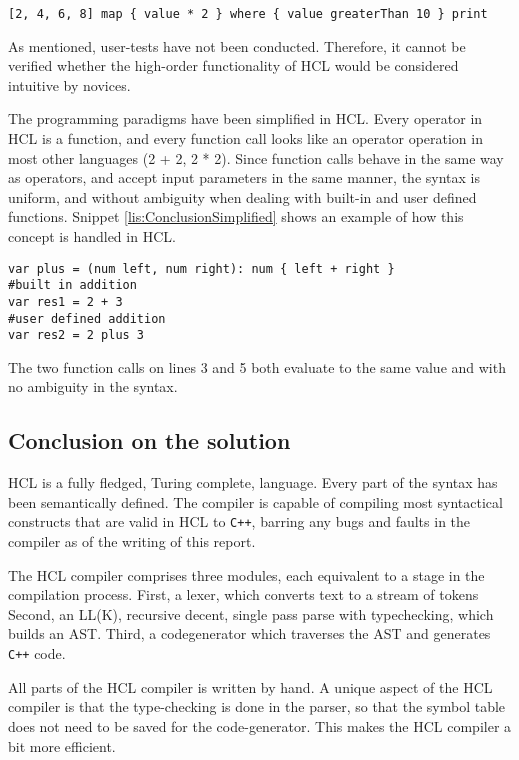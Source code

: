 \begin{lstlisting}[language=hcl,label=lis:ConclusionMapFilter,caption=High-order functionality in HCL]
[2, 4, 6, 8] map { value * 2 } where { value greaterThan 10 } print
\end{lstlisting}

As mentioned, user-tests have not been conducted.
Therefore, it cannot be verified whether the high-order functionality of HCL would be considered intuitive by novices.

The programming paradigms have been simplified in HCL.
Every operator in HCL is a function, and every function call looks like an operator operation in most other languages (2 + 2, 2 * 2).
Since function calls behave in the same way as operators, and accept input parameters in the same manner, the syntax is uniform, and without ambiguity when dealing with built-in and user defined functions.
Snippet \ref{lis:ConclusionSimplified} shows an example of how this concept is handled in HCL.

\begin{lstlisting}[language=hcl,label=lis:ConclusionSimplified,caption=Built-in and user defined function]
var plus = (num left, num right): num { left + right }
#built in addition
var res1 = 2 + 3
#user defined addition
var res2 = 2 plus 3 
\end{lstlisting}

The two function calls on lines 3 and 5 both evaluate to the same value and with no ambiguity in the syntax.

\subsection{Conclusion on the solution}
HCL is a fully fledged, Turing complete, language.
Every part of the syntax has been semantically defined. 
The compiler is capable of compiling most syntactical constructs that are valid in HCL to \texttt{C++}, barring any bugs and faults in the compiler as of the writing of this report.

The HCL compiler comprises three modules, each equivalent to a stage in the compilation process.
First, a lexer, which converts text to a stream of tokens
Second, an LL(K), recursive decent, single pass parse with typechecking, which builds an AST.
Third, a codegenerator which traverses the AST and generates \texttt{C++} code.

All parts of the HCL compiler is written by hand.
A unique aspect of the HCL compiler is that the type-checking is done in the parser, so that the symbol table does not need to be saved for the code-generator.
This makes the HCL compiler a bit more efficient.

